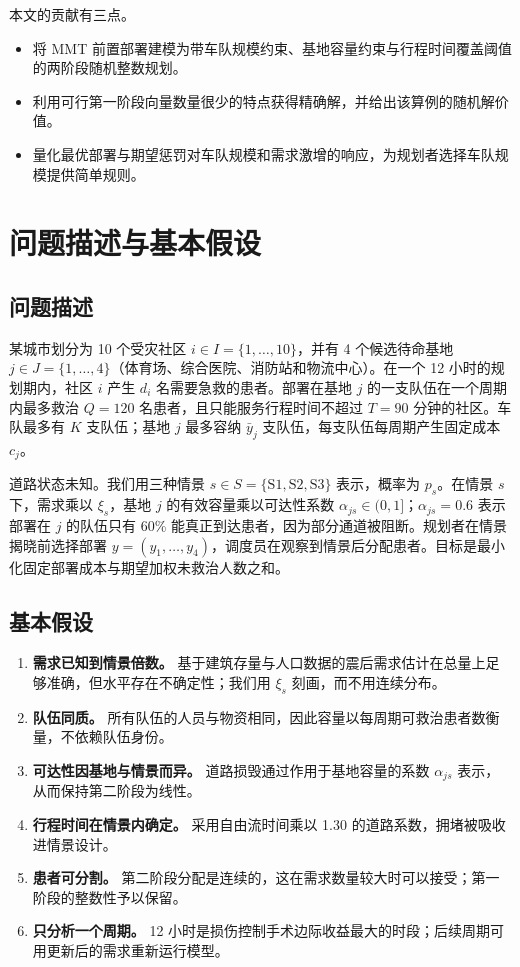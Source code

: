\documentclass[12pt,a4paper,fontset=windows]{ctexart}
\begin{document}
本文的贡献有三点。
\begin{itemize}[itemsep=2pt]
\item 将 MMT 前置部署建模为带车队规模约束、基地容量约束与行程时间覆盖阈值的两阶段随机整数规划。
\item 利用可行第一阶段向量数量很少的特点获得精确解，并给出该算例的随机解价值。
\item 量化最优部署与期望惩罚对车队规模和需求激增的响应，为规划者选择车队规模提供简单规则。
\end{itemize}

\section{问题描述与基本假设}

\subsection{问题描述}

某城市划分为 10 个受灾社区 $i\in I=\{1,\dots,10\}$，并有 4 个候选待命基地 $j\in J=\{1,\dots,4\}$（体育场、综合医院、消防站和物流中心）。在一个 12 小时的规划期内，社区 $i$ 产生 $d_i$ 名需要急救的患者。部署在基地 $j$ 的一支队伍在一个周期内最多救治 $Q=120$ 名患者，且只能服务行程时间不超过 $T=90$ 分钟的社区。车队最多有 $K$ 支队伍；基地 $j$ 最多容纳 $\bar y_j$ 支队伍，每支队伍每周期产生固定成本 $c_j$。

道路状态未知。我们用三种情景 $s\in S=\{\mathrm{S1},\mathrm{S2},\mathrm{S3}\}$ 表示，概率为 $p_s$。在情景 $s$ 下，需求乘以 $\xi_s$，基地 $j$ 的有效容量乘以可达性系数 $\alpha_{js}\in(0,1]$；$\alpha_{js}=0.6$ 表示部署在 $j$ 的队伍只有 60\% 能真正到达患者，因为部分通道被阻断。规划者在情景揭晓前选择部署 $y=(y_1,\dots,y_4)$，调度员在观察到情景后分配患者。目标是最小化固定部署成本与期望加权未救治人数之和。

\subsection{基本假设}

\begin{enumerate}[itemsep=2pt]
\item \textbf{需求已知到情景倍数。} 基于建筑存量与人口数据的震后需求估计在总量上足够准确，但水平存在不确定性；我们用 $\xi_s$ 刻画，而不用连续分布。
\item \textbf{队伍同质。} 所有队伍的人员与物资相同，因此容量以每周期可救治患者数衡量，不依赖队伍身份。
\item \textbf{可达性因基地与情景而异。} 道路损毁通过作用于基地容量的系数 $\alpha_{js}$ 表示，从而保持第二阶段为线性。
\item \textbf{行程时间在情景内确定。} 采用自由流时间乘以 1.30 的道路系数，拥堵被吸收进情景设计。
\item \textbf{患者可分割。} 第二阶段分配是连续的，这在需求数量较大时可以接受；第一阶段的整数性予以保留。
\item \textbf{只分析一个周期。} 12 小时是损伤控制手术边际收益最大的时段；后续周期可用更新后的需求重新运行模型。
\end{enumerate}
\end{document}
